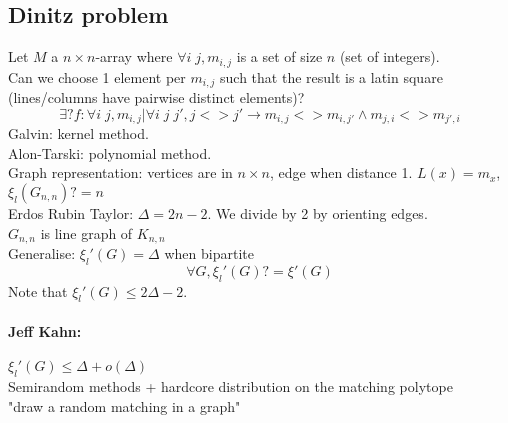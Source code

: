 \documentclass[12pt]{article}
\begin{document}
\subsection{Dinitz problem}
Let $M$ a $n \times n$-array where $\forall i \; j, m_{i,j}$ is a set of size $n$ (set of integers).\\
Can we choose 1 element per $m_{i,j}$ such that the result is a latin square (lines/columns have pairwise distinct elements)?\\
\[ \exists? f : \forall i \; j, m_{i,j} | \forall i \; j \; j', j<>j' \rightarrow m_{i,j} <> m_{i,j'} \wedge m_{j,i} <> m_{j',i} \]
Galvin: kernel method.\\
Alon-Tarski: polynomial method.\\
Graph representation: vertices are in $n \times n$, edge when distance 1. $L(x) = m_x$, $\xi_l(G_{n,n}) ?= n$\\
Erdos Rubin Taylor: $\Delta = 2n-2$. We divide by 2 by orienting edges.\\
$G_{n,n}$ is line graph of $K_{n,n}$\\
Generalise: $\xi_l'(G) = \Delta$ when bipartite
\[ \forall G, \xi_l'(G) ?= \xi'(G) \]
Note that $\xi_l'(G) \leqslant 2\Delta - 2$.\\

\paragraph{Jeff Kahn:} $\xi_l'(G) \leqslant \Delta + o(\Delta)$\\
Semirandom methods + hardcore distribution on the matching polytope\\
"draw a random matching in a graph"\\
\end{document}
